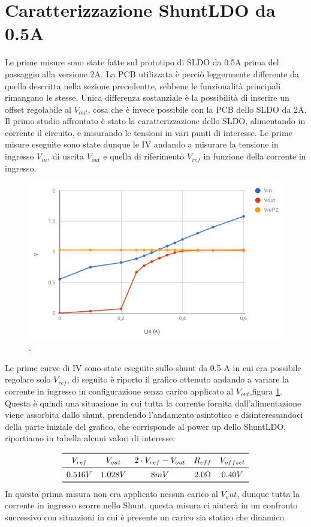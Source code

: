 \section{Caratterizzazione ShuntLDO da 0.5A}
Le prime misure sono state fatte sul prototipo di SLDO da 0.5A prima del passaggio alla versione 2A. La PCB utilizzata è perciò leggermente differente da quella descritta nella sezione precedentte, sebbene le funzionalità principali rimangano le stesse. Unica differenza sostanziale è la possibilità di inserire un offset regolabile al $V_{out}$, cosa che è invece possibile con la PCB dello SLDO da 2A.
Il primo studio affrontato è stato la caratterizzazione dello SLDO, alimentando in corrente il circuito, e misurando le tensioni in vari punti di interesse. Le prime misure eseguite sono state dunque le IV andando a misurare la tensione in ingresso $V_{in}$, di uscita $V_{out}$ e quella di riferimento $V_{ref}$ in funzione della corrente in ingresso.
\begin{figure}
\centering
\includegraphics[scale=.5]{Immagini/provaSLDO5}
\caption{.}
\label{provaSLDO5}
\end{figure}

Le prime curve di IV sono state eseguite sullo shunt da 0.5 A in cui era possibile regolare solo $V_{ref}$, di seguito è riporto il grafico ottenuto andando a variare la corrente in ingresso in configurazione senza carico applicato al $V_{out}$,figura \ref{provaSLDO5}. Questa è quindi una situazione in cui tutta la corrente fornita dall'alimentazione viene assorbita dallo shunt,  prendendo l'andamento asintotico e disinteressandoci della parte iniziale del grafico, che corrisponde al power up dello ShuntLDO, riportiamo in tabella alcuni valori di interesse: 

\[
\begin{array}{ccccc}

\toprule
V_{ref} & V_{out} & 2 \cdot V_{ref}- V_{out} & R_{eff} & V_{offset} \\

\midrule

0.516 V & 1.028 V & 8 mV & 2.0 \Omega & 0.40 V \\

\bottomrule
\end{array}
\]
In questa prima misura non era applicato nessun carico al $V_out$, dunque tutta la corrente in ingresso scorre nello Shunt, questa misura ci aiuterà in un confronto successivo con situazioni in cui è presente un carico sia statico che dinamico. 

